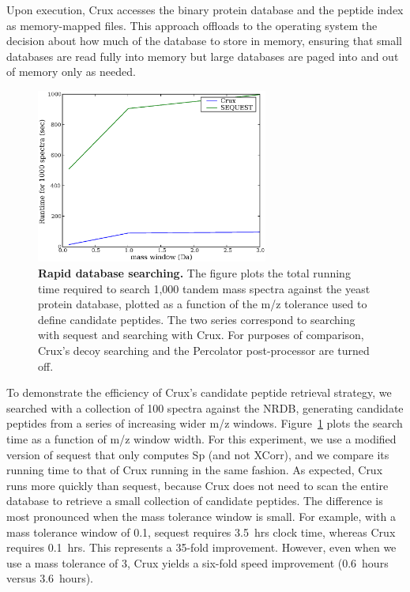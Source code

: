 \documentclass[12pt]{article}
\begin{document}
Upon execution, Crux accesses the binary protein database and the
peptide index as memory-mapped files.  This approach offloads to the
operating system the decision about how much of the database to store
in memory, ensuring that small databases are read fully into memory
but large databases are paged into and out of memory only as needed.

\begin{figure}
  \centering
  \includegraphics[width=3in]{./Images/indexing.eps}
  \caption{{\bf Rapid database searching.}  The figure plots the total
  running time required to search 1,000 tandem mass spectra against
  the yeast protein database, plotted as a function of the m/z
  tolerance used to define candidate peptides.  The two series
  correspond to searching with {\sc sequest} and searching with Crux.  For
  purposes of comparison, Crux's decoy searching and the Percolator
  post-processor are turned off.
  \label{figure:indexing}}
\end{figure}

To demonstrate the efficiency of Crux's candidate peptide retrieval
strategy, we searched with a collection of 100 spectra against the
NRDB, generating candidate peptides from a series of increasing wider
m/z windows.  Figure~\ref{figure:indexing} plots the search time as a
function of m/z window width.  For this experiment, we use a modified
version of {\sc sequest} that only computes Sp (and not XCorr), and we
compare its running time to that of Crux running in the same fashion.
As expected, Crux runs more quickly than {\sc sequest}, because Crux does
not need to scan the entire database to retrieve a small collection of
candidate peptides.  The difference is most pronounced when the mass
tolerance window is small.  For example, with a mass tolerance window
of 0.1, {\sc sequest} requires 3.5~hrs clock time, whereas Crux requires
0.1~hrs.  This represents a 35-fold improvement.  However, even when
we use a mass tolerance of 3, Crux yields a six-fold speed improvement
(0.6~hours versus 3.6~hours).
\end{document}
